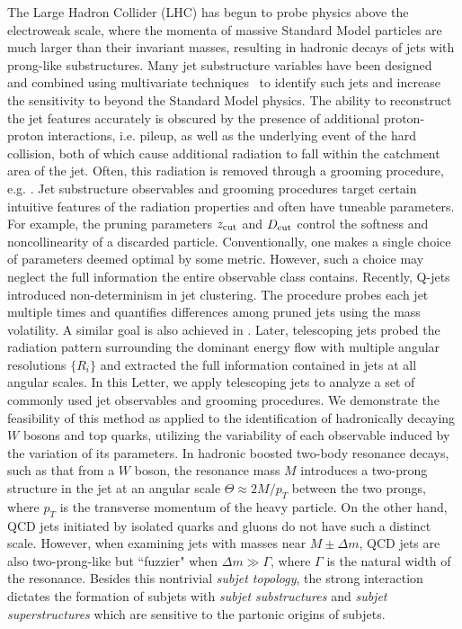 \documentclass[aps,prl,floatfix,preprintnumbers,twocolumn,groupedaddress,nofootinbib]{revtex4-1}
\begin{document}
The Large Hadron Collider (LHC) has begun to probe physics above the electroweak scale, where the momenta of massive Standard Model particles are much larger than their invariant masses, resulting in hadronic decays of jets with prong-like substructures. Many jet substructure variables have been designed~\cite{Abdesselam:2010pt,Altheimer:2012mn,Altheimer:2013yza} and combined using multivariate techniques~\cite{Adams:2015hiv,Larkoski:2017jix,ATLAS-CONF-2017-064,Khachatryan:1955546} to identify such jets and increase the sensitivity to beyond the Standard Model physics. The ability to reconstruct the jet features accurately is obscured by the presence of additional proton-proton interactions, i.e. pileup, as well as the underlying event of the hard collision, both of which cause additional radiation to fall within the catchment area of the jet. Often, this radiation is removed through a grooming procedure, e.g. \cite{Ellis:2009su,Krohn:2009th,Dasgupta:2013ihk,Larkoski:2014wba}. Jet substructure observables and grooming procedures target certain intuitive features of the radiation properties and often have tuneable parameters. For example, the pruning parameters $z_{\rm cut}$ and $D_{\rm cut}$ control the softness and noncollinearity of a discarded particle. Conventionally, one makes a single choice of parameters deemed optimal by some metric. However, such a choice may neglect the full information the entire observable class contains.
\newline \indent Recently, Q-jets \cite{Ellis:2012sn} introduced non-determinism in jet clustering. The procedure probes each jet multiple times and quantifies differences among pruned jets using the mass volatility. A similar goal is also achieved in \cite{Mackey:2015hwa}. Later, telescoping jets \cite{Chien:2014hla} probed the radiation pattern surrounding the dominant energy flow with multiple angular resolutions $\{R_i\}$ and extracted the full information contained in jets at all angular scales. In this Letter, we apply telescoping jets to analyze a set of commonly used jet observables and grooming procedures. We demonstrate the feasibility of this method as applied to the identification of hadronically decaying $W$ bosons and top quarks, utilizing the variability of each observable induced by the variation of its parameters.
\newline \indent In hadronic boosted two-body resonance decays, such as that from a $W$ boson, the resonance mass $M$ introduces a two-prong structure in the jet at an angular scale $\Theta\approx 2M/p_T$ between the two prongs, where $p_T$ is the transverse momentum of the heavy particle. On the other hand, QCD jets initiated by isolated quarks and gluons do not have such a distinct scale. However, when examining jets with masses near $M\pm\Delta m$, QCD jets are also two-prong-like but ``fuzzier" when $\Delta m\gg\Gamma$, where $\Gamma$ is the natural width of the resonance. Besides this nontrivial {\sl subjet topology}, the strong interaction dictates the formation of subjets with {\sl subjet substructures} and {\sl subjet superstructures} \cite{Gallicchio:2010sw} which are sensitive to the partonic origins of subjets.
\end{document}

